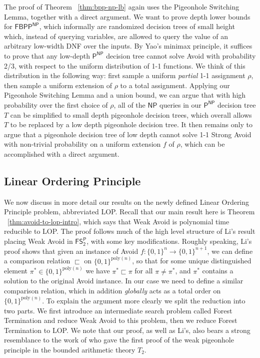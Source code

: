 \documentclass[11pt]{article}
\newcommand{\todo}[1]{\textcolor{red}{TODO: #1}}
\newcommand{\B}{\{0,1\}}
\newcommand{\poly}{\mathrm{poly}}
\begin{document}
The proof of Theorem ~\ref{thm:bpp-np-lb} again uses the Pigeonhole Switching Lemma, together with a direct argument. 
We want to prove depth lower bounds for $\mathsf{FBPP^{NP}}$, which informally are randomized decision trees of small height which, instead of querying variables, are allowed to query the value of an arbitrary low-width DNF over the inputs. 
By Yao's minimax principle, it suffices to prove that any low-depth $\mathsf{P^{NP}}$ decision tree cannot solve Avoid with probability 2/3, with respect to the uniform distribution of 1-1 functions. We think of this distribution in the following way: first sample a uniform \emph{partial} 1-1 assignment $\rho$, then sample a uniform extension of $\rho$ to a total assignment.
Applying our Pigeonhole Switching Lemma and a union bound, we can argue that with high probability over the first choice of $\rho$, all of the $\mathsf{NP}$ queries in our $\mathsf{P^{NP}}$ decision tree $T$ can be simplified to small depth pigeonhole decision trees, which overall allows $T$ to be replaced by a low depth pigeonhole decision tree. It then remains only to argue that a pigeonhole decision tree of low depth cannot solve 1-1 Strong Avoid with non-trivial probability on a uniform extension $f$ of $\rho$, which can be accomplished with a direct argument.

\subsection{Linear Ordering Principle}
\label{sec:intro-lop} 
We now discuss in more detail our results on the newly defined Linear Ordering Principle problem, abbreviated LOP. Recall that our main result here is Theorem ~\ref{thm:avoid-to-lop-intro}, which says that Weak Avoid is polynomial time reducible to LOP. The proof follows much of the high level structure of Li's result placing Weak Avoid in $\mathsf{FS_2^P}$, with some key modifications. Roughly speaking, Li's proof shows that given an instance of Avoid $f: \B^n \to \B^{n+1}$, we can define a comparison relation $\sqsubset$ on $\B^{\poly(n)}$, so that for some unique distinguished element $\pi^* \in\B^{\poly(n)}$ we have $\pi^* \sqsubset \pi$ for all $\pi \neq \pi^*$, and $\pi^*$ contains a solution to the original Avoid instance. In our case we need to define a similar comparison relation, which in addition \emph{globally} acts as a total order on $\B^{\poly(n)}$. To explain the argument more clearly we split the reduction into two parts. We first introduce an intermediate search problem called Forest Termination and reduce Weak Avoid to this problem, then we reduce Forest Termination to LOP.
We note that our proof, as well as Li's, also bears a strong resemblance to the work of \cite{Paris-Wilkie-Woods} who gave the first proof of the weak pigeonhole principle in the bounded arithmetic theory $T_2$.%
\end{document}
